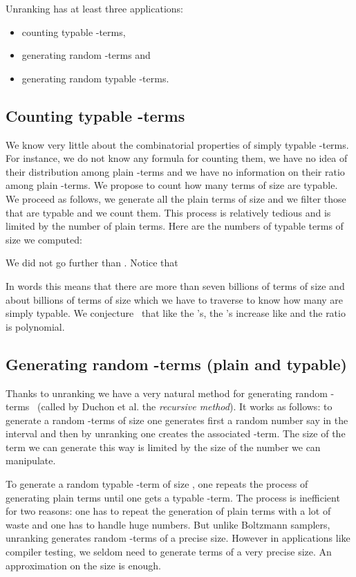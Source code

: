 \documentclass{sig-alternate}
\begin{document}
\begin{figure*}[!t]
Unranking has at least three applications:
\begin{itemize}
\item counting typable -terms,
\item generating random -terms and
\item generating random
  typable -terms.
\end{itemize}


\subsection{Counting typable -terms}
\label{sec:cont_typ}

We know very little about the combinatorial properties of simply typable -terms.
For instance, we do not know any formula for counting them, we have no idea of their
distribution among plain -terms and we have no information on their ratio among
plain -terms.  We propose to count how many terms of size  are typable.  We
proceed as follows, we generate all the plain terms of size  and we filter those
that are typable and we count them.  This process is relatively tedious and is
limited by the number of plain terms. Here are the numbers  of typable terms
of size  we computed:

We did not go further than . Notice that

In words this means that there are more than seven billions of terms of size  and about
 billions of terms of size  which we have to traverse to know how many are
simply typable.  We conjecture~\cite{lescanne13} that like the 's, the
's increase like  and the ratio  is
polynomial.

\subsection{Generating random -terms (plain and typable)}
\label{sec:gen}

Thanks to unranking we have a very natural method for generating random
-terms~\cite{nijenhuis78:_combin} (called by Duchon et
al. \cite{DBLP:journals/cpc/DuchonFLS04} the \emph{recursive method}).  It works as
follows: to generate a random -terms of size  one generates first a random
number say  in the interval  and then by unranking  one
creates the associated -term. The size of the term we can generate this way is
limited by the size of the number  we can manipulate. 

To generate a random typable -term of size , one repeats the process of
generating plain terms until one gets a typable -term.  The process is
inefficient for two reasons: one has to repeat the generation of plain terms with a
lot of waste and one has to handle huge numbers.  But unlike Boltzmann samplers,
unranking generates random -terms of a precise size. However in applications like
compiler testing, we seldom need to generate terms of a very precise size. An
approximation on the size is enough.


\end{figure*}
\end{document}
